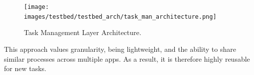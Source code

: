 \begin{figure}[h]
    \raggedright
    \texttt{[image: images/testbed/testbed\_arch/task\_man\_architecture.png]}
    \caption{Task Management Layer Architecture.}
    \label{fig:task_management_architecture}
\end{figure}

This approach values granularity, being lightweight, and the ability to share similar processes across multiple apps. As a result, it is therefore highly reusable for new tasks.



        
    



    

